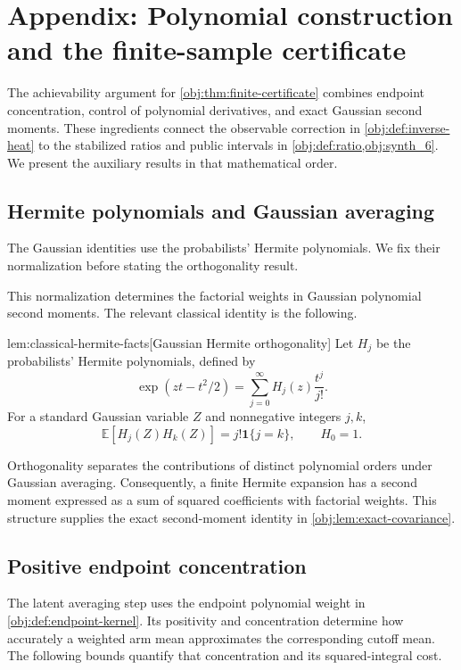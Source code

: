 \section{Appendix: Polynomial construction and the finite-sample certificate}

The achievability argument for \cref{obj:thm:finite-certificate} combines endpoint concentration, control of polynomial derivatives, and exact Gaussian second moments. These ingredients connect the observable correction in \cref{obj:def:inverse-heat} to the stabilized ratios and public intervals in \cref{obj:def:ratio,obj:synth_6}. We present the auxiliary results in that mathematical order.

\subsection{Hermite polynomials and Gaussian averaging}

The Gaussian identities use the probabilists' Hermite polynomials. We fix their normalization before stating the orthogonality result.



This normalization determines the factorial weights in Gaussian polynomial second moments. The relevant classical identity is the following.

\begin{theoremv}{lem:classical-hermite-facts}[Gaussian Hermite orthogonality]
Let \(H_j\) be the probabilists' Hermite polynomials, defined by
\[
\exp(zt-t^2/2)
=\sum_{j=0}^{\infty}H_j(z)\frac{t^j}{j!}.
\]
For a standard Gaussian variable \(Z\) and nonnegative integers \(j,k\),
\[
\mathbb E[H_j(Z)H_k(Z)]
=j!\mathbf1\{j=k\},
\qquad H_0=1.
\]
\end{theoremv}

Orthogonality separates the contributions of distinct polynomial orders under Gaussian averaging. Consequently, a finite Hermite expansion has a second moment expressed as a sum of squared coefficients with factorial weights. This structure supplies the exact second-moment identity in \cref{obj:lem:exact-covariance}.

\subsection{Positive endpoint concentration}

The latent averaging step uses the endpoint polynomial weight in \cref{obj:def:endpoint-kernel}. Its positivity and concentration determine how accurately a weighted arm mean approximates the corresponding cutoff mean. The following bounds quantify that concentration and its squared-integral cost.

